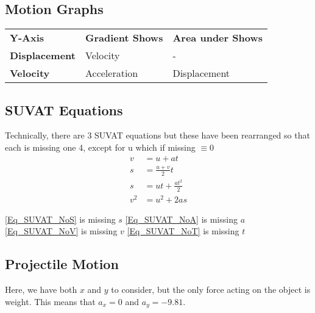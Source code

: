\subsection{Motion Graphs}
\begin{tabular}{lll}
	\textbf{Y-Axis}       & \textbf{Gradient Shows} & \textbf{Area under Shows} \\
	\textbf{Displacement} & Velocity                & -                         \\
	\textbf{Velocity}     & Acceleration            & Displacement             
\end{tabular}

\subsection{SUVAT Equations}
 {
	Technically, there are 3 SUVAT equations but these have been rearranged so that each is missing one 4, except for u which if missing \( \equiv 0 \)
	\begin{align}
		v &= u + at \label{Eq_SUVAT_NoS}  \\
		s &= \frac{u + v}{2}t \label{Eq_SUVAT_NoA} \\
		s &= ut + \frac{at^2}{2} \label{Eq_SUVAT_NoV} \\
		v^2 &= u^2 + 2as \label{Eq_SUVAT_NoT}
	\end{align}
	\begin{itemize}
		\ii \eqref{Eq_SUVAT_NoS} is missing \(s\)
		\ii \eqref{Eq_SUVAT_NoA} is missing \(a\)
		\ii \eqref{Eq_SUVAT_NoV} is missing \(v\)
		\ii \eqref{Eq_SUVAT_NoT} is missing \(t\)
	\end{itemize}
}

\subsection{Projectile Motion}
Here, we have both \(x\) and \(y\) to consider, but the only force acting on the object is weight. This means that \(a_x = 0\) and \(a_y = -9.81\).

